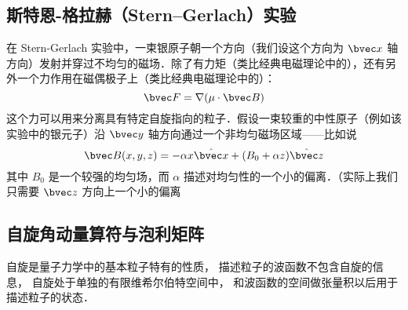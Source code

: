 
\begin{issues}
\issueDraft
\end{issues}


\subsection{斯特恩-格拉赫（Stern–Gerlach）实验}

在 Stern-Gerlach 实验中，一束银原子朝一个方向（我们设这个方向为 $\bvec x$ 轴方向）发射并穿过不均匀的磁场．除了有力矩（类比经典电磁理论中的），还有另外一个力作用在磁偶极子上（类比经典电磁理论中的）：
\begin{equation}\label{Spin_eq1}
\bvec F=\nabla(\mu\cdot \bvec B)
\end{equation}
这个力可以用来分离具有特定自旋指向的粒子．假设一束较重的中性原子（例如该实验中的银元子）沿 $\bvec y$ 轴方向通过一个非均匀磁场区域——比如说
\begin{equation}\label{Spin_eq2}
\bvec B(x,y,z)=-\alpha x \hat{\bvec x}+(B_0+\alpha z)\hat {\bvec z}
\end{equation}
其中 $B_0$ 是一个较强的均匀场，而 $\alpha$ 描述对均匀性的一个小的偏离．（实际上我们只需要 $\bvec z$ 方向上一个小的偏离

\subsection{自旋角动量算符与泡利矩阵}

自旋是量子力学中的基本粒子特有的性质， 描述粒子的波函数不包含自旋的信息， 自旋处于单独的有限维希尔伯特空间中， 和波函数的空间做张量积以后用于描述粒子的状态．

